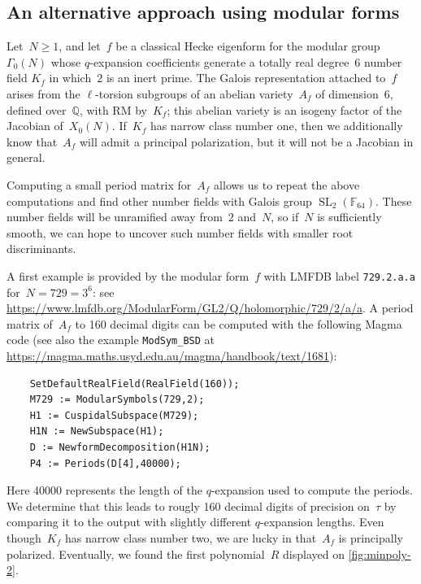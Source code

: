 \documentclass[12pt,oneside]{amsart}
\numberwithin{equation}{section}
\theoremstyle{definition}
\newcommand{\Q}{\mathbb{Q}}
\newcommand{\F}{\mathbb{F}}
\DeclareMathOperator{\SL}{SL}
\begin{document}
\subsection{An alternative approach using modular forms}
\label{subsec:galois-mf}

Let~$N\geq 1$, and let~$f$ be a classical Hecke eigenform for the modular
group~$\Gamma_0(N)$ whose $q$-expansion coefficients generate a totally real
degree~6 number field $K_f$ in which~$2$ is an inert prime. The Galois
representation attached to~$f$ arises from the $\ell$-torsion subgroups of an
abelian variety~$A_f$ of dimension~6, defined over~$\Q$, with RM by~$K_f$; this
abelian variety is an isogeny factor of the Jacobian of~$X_0(N)$. If~$K_f$ has
narrow class number one, then we additionally know that~$A_f$ will admit a
principal polarization, but it will not be a Jacobian in general.

Computing a small period matrix for~$A_f$ allows us to repeat the above
computations and find other number fields with Galois group
$\SL_2(\F_{64})$. These number fields will be unramified away from~$2$ and~$N$,
so if~$N$ is sufficiently smooth, we can hope to uncover such number fields
with smaller root discriminants.

A first example is provided by the modular form~$f$ with LMFDB label
\texttt{729.2.a.a} for~$N=729=3^6$: see
\url{https://www.lmfdb.org/ModularForm/GL2/Q/holomorphic/729/2/a/a}. A period
matrix of~$A_f$ to 160 decimal digits can be computed with the following Magma
code (see also the example \texttt{ModSym\_BSD} at
\url{https://magma.maths.usyd.edu.au/magma/handbook/text/1681}):
\begin{center}
\begin{verbatim}
    SetDefaultRealField(RealField(160));
    M729 := ModularSymbols(729,2);
    H1 := CuspidalSubspace(M729);
    H1N := NewSubspace(H1);
    D := NewformDecomposition(H1N);
    P4 := Periods(D[4],40000);
\end{verbatim}
\end{center}

Here 40000 represents the length of the $q$-expansion used to compute the
periods. We determine that this leads to rougly 160 decimal digits of precision
on~$\tau$ by comparing it to the output with slightly different $q$-expansion
lengths. Even though~$K_f$ has narrow class number two, we are lucky in
that~$A_f$ is principally polarized. Eventually, we found the first
polynomial~$R$ displayed on \cref{fig:minpoly-2}.
\end{document}
